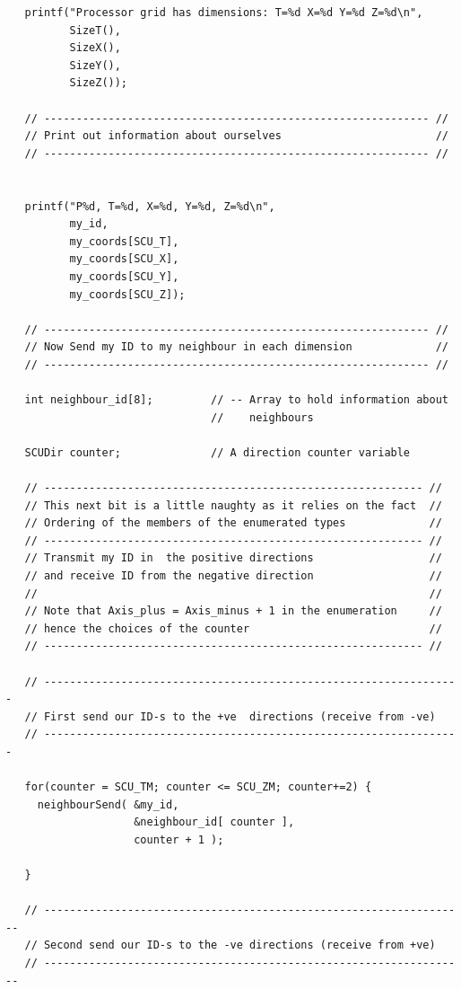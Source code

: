 {\begin{verbatim}
   printf("Processor grid has dimensions: T=%d X=%d Y=%d Z=%d\n",
          SizeT(),
          SizeX(),
          SizeY(),
          SizeZ());

   // ------------------------------------------------------------ //
   // Print out information about ourselves                        //
   // ------------------------------------------------------------ //


   printf("P%d, T=%d, X=%d, Y=%d, Z=%d\n",
          my_id,
          my_coords[SCU_T],
          my_coords[SCU_X],
          my_coords[SCU_Y],
          my_coords[SCU_Z]);

   // ------------------------------------------------------------ //
   // Now Send my ID to my neighbour in each dimension             //
   // ------------------------------------------------------------ //

   int neighbour_id[8];         // -- Array to hold information about
                                //    neighbours

   SCUDir counter;              // A direction counter variable

   // ----------------------------------------------------------- //
   // This next bit is a little naughty as it relies on the fact  //
   // Ordering of the members of the enumerated types             //
   // ----------------------------------------------------------- //
   // Transmit my ID in  the positive directions                  //
   // and receive ID from the negative direction                  //
   //                                                             //
   // Note that Axis_plus = Axis_minus + 1 in the enumeration     //
   // hence the choices of the counter                            //
   // ----------------------------------------------------------- //
    
   // -----------------------------------------------------------------
   // First send our ID-s to the +ve  directions (receive from -ve)
   // -----------------------------------------------------------------

   for(counter = SCU_TM; counter <= SCU_ZM; counter+=2) {
     neighbourSend( &my_id,
                    &neighbour_id[ counter ],
                    counter + 1 );
                    
   }
 
   // ------------------------------------------------------------------
   // Second send our ID-s to the -ve directions (receive from +ve)
   // ------------------------------------------------------------------
  

\end{verbatim}}
